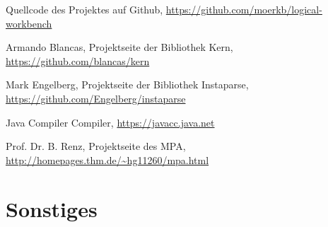 \documentclass[ngerman,a4paper,abstracton,open=right,twoside=false,toc=listofnumbered,bibtotocnumbered]{scrreprt}
\begin{document}
\begin{thebibliography}{7}
		Quellcode des Projektes auf Github, 
		\url{https://github.com/moerkb/logical-workbench}

		Armando Blancas,
		Projektseite der Bibliothek Kern, 
		\url{https://github.com/blancas/kern}

		Mark Engelberg,
		Projektseite der Bibliothek Instaparse,
		\url{https://github.com/Engelberg/instaparse}

		Java Compiler Compiler,
		\url{https://javacc.java.net}

		Prof. Dr. B. Renz,
		Projektseite des MPA,
		\url{http://homepages.thm.de/~hg11260/mpa.html}
\end{thebibliography}

\listoffigures %
\listoftables

\chapter{Sonstiges}
\end{document}
